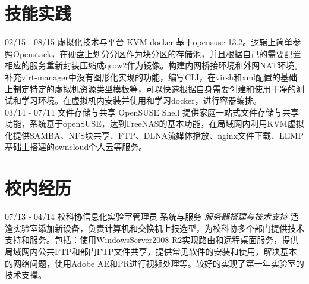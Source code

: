 \documentclass[]{friggeri-cv}
\begin{document}
\section{技能实践}
\begin{entrylist}
  \entry
    {02/15 - 08/15 }
    {虚拟化技术与平台}
    {KVM docker }
    {基于opensuse 13.2。逻辑上简单参照Openstack，在硬盘上划分分区作为块分区的存储池，并且根据自己的需要配置相应的服务重新封装压缩成qcow2作为镜像。构建内网桥接环境和外网NAT环境。补充virt-manager中没有图形化实现的功能，编写CLI，在virsh和xml配置的基础上制定特定的虚拟机资源类型模板等，可以快速根据自身需要创建和使用干净的测试和学习环境。在虚拟机内安装并使用和学习docker，进行容器编排。
    \\}   
  \entry
    {03/14 - 07/14 }
    {文件存储与共享}
    {OpenSUSE  Shell}
    {提供家庭一站式文件存储与共享功能，系统基于openSUSE，达到FreeNAS的基本功能，在局域网内利用KVM虚拟化提供SAMBA、NFS块共享、FTP、DLNA流媒体播放、nginx文件下载、LEMP基础上搭建的owncloud个人云等服务。\\}%
    



\end{entrylist}

\section{校内经历}
\begin{entrylist}
  \entry
    {07/13 - 04/14}
    {校科协信息化实验室管理员}
    {系统与服务}
    {\emph{服务器搭建与技术支持}
    适逢实验室添加新设备，负责计算机和交换机上报选型，为校科协多个部门提供技术支持和服务。包括：使用WindowsServer2008 R2实现路由和远程桌面服务，提供局域网内公共FTP和部门FTP文件共享，提供常见软件的安装和使用，解决基本的网络问题，使用Adobe AE和PR进行视频处理等。较好的实现了第一年实验室的技术支撑。  \\     
    }
    
\end{entrylist}


\newpage
\end{document}

